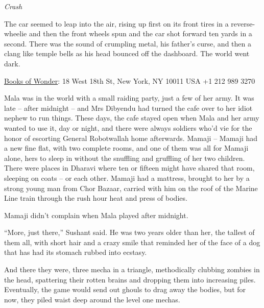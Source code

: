 \emph{Crash}

The car seemed to leap into the air, rising up first on its front
tires in a reverse-wheelie and then the front wheels spun and the
car shot forward ten yards in a second. There was the sound of
crumpling metal, his father's curse, and then a clang like temple
bells as his head bounced off the dashboard. The world went dark.

\tb

{\href{http://www.booksofwonder.com/}{Books of Wonder}: 18 West 18th St, New York, NY 10011 USA +1 212 989 3270}

Mala was in the world with a small raiding party, just a few of her
army. It was late -- after midnight -- and Mrs Dibyendu had turned
the cafe over to her idiot nephew to run things. These days, the
cafe stayed open when Mala and her army wanted to use it, day or
night, and there were always soldiers who'd vie for the honor of
escorting General Robotwallah home afterwards. Mamaji -- Mamaji had
a new fine flat, with two complete rooms, and one of them was all
for Mamaji alone, hers to sleep in without the snuffling and
gruffling of her two children. There were places in Dharavi where
ten or fifteen might have shared that room, sleeping on coats -- or
each other. Mamaji had a mattress, brought to her by a strong young
man from Chor Bazaar, carried with him on the roof of the Marine
Line train through the rush hour heat and press of bodies.

Mamaji didn't complain when Mala played after midnight.

``More, just there,'' Sushant said. He was two years older than her,
the tallest of them all, with short hair and a crazy smile that
reminded her of the face of a dog that has had its stomach rubbed
into ecstasy.

And there they were, three mecha in a triangle, methodically
clubbing zombies in the head, spattering their rotten brains and
dropping them into increasing piles. Eventually, the game would
send out ghouls to drag away the bodies, but for now, they piled
waist deep around the level one mechas.

